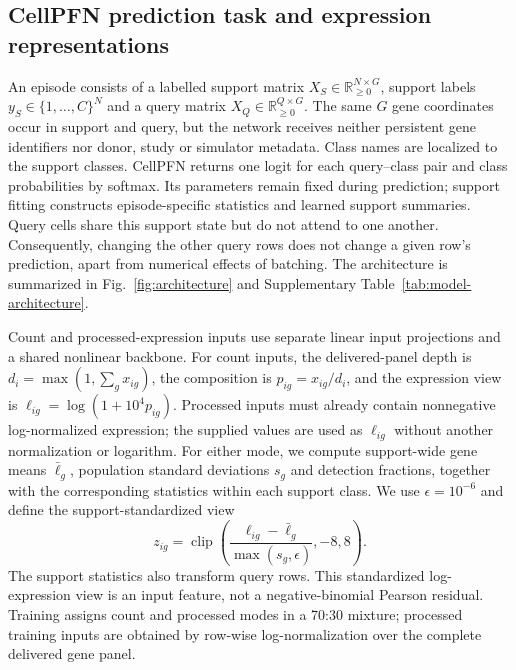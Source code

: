 \subsection*{CellPFN prediction task and expression representations}
\label{methods:cellpfn-task}
An episode consists of a labelled support matrix $X_S\in\mathbb{R}_{\geq0}^{N\times G}$, support labels $y_S\in\{1,\ldots,C\}^{N}$ and a query matrix $X_Q\in\mathbb{R}_{\geq0}^{Q\times G}$. The same $G$ gene coordinates occur in support and query, but the network receives neither persistent gene identifiers nor donor, study or simulator metadata. Class names are localized to the support classes. CellPFN returns one logit for each query--class pair and class probabilities by softmax. Its parameters remain fixed during prediction; support fitting constructs episode-specific statistics and learned support summaries. Query cells share this support state but do not attend to one another. Consequently, changing the other query rows does not change a given row's prediction, apart from numerical effects of batching. The architecture is summarized in Fig.~\ref{fig:architecture} and Supplementary Table~\ref{tab:model-architecture}.

Count and processed-expression inputs use separate linear input projections and a shared nonlinear backbone. For count inputs, the delivered-panel depth is $d_i=\max(1,\sum_g x_{ig})$, the composition is $p_{ig}=x_{ig}/d_i$, and the expression view is $\ell_{ig}=\log(1+10^4p_{ig})$. Processed inputs must already contain nonnegative log-normalized expression; the supplied values are used as $\ell_{ig}$ without another normalization or logarithm. For either mode, we compute support-wide gene means $\bar\ell_g$, population standard deviations $s_g$ and detection fractions, together with the corresponding statistics within each support class. We use $\epsilon=10^{-6}$ and define the support-standardized view
\begin{equation}
 z_{ig}=\operatorname{clip}\!\left(\frac{\ell_{ig}-\bar\ell_g}{\max(s_g,\epsilon)},-8,8\right).
 \label{eq:model-standardization}
\end{equation}
The support statistics also transform query rows. This standardized log-expression view is an input feature, not a negative-binomial Pearson residual. Training assigns count and processed modes in a 70:30 mixture; processed training inputs are obtained by row-wise log-normalization over the complete delivered gene panel.

